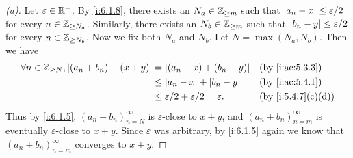 \begin{proof}[(a)]
  Let \(\varepsilon \in \mathbb{R}^+\).
  By \cref{i:6.1.8}, there exists an \(N_a \in \mathbb{Z}_{\geq m}\) such that \(\left\lvert a_n - x\right\rvert \leq \varepsilon / 2\) for every \(n \in \mathbb{Z}_{\geq N_a}\).
  Similarly, there exists an \(N_b \in \mathbb{Z}_{\geq m}\) such that \(\left\lvert b_n - y\right\rvert \leq \varepsilon / 2\) for every \(n \in \mathbb{Z}_{\geq N_b}\).
  Now we fix both \(N_a\) and \(N_b\).
  Let \(N = \max(N_a, N_b)\).
  Then we have
  \begin{align*}
    \forall n \in \Z_{\geq N}, \abs{(a_n + b_n) - (x + y)} & = \abs{(a_n - x) + (b_n - y)}                         &  & \by{i:ac:5.3.3}   \\
                                                           & \leq \abs{a_n - x} + \abs{b_n - y}                    &  & \by{i:ac:5.4.1}   \\
                                                           & \leq \varepsilon / 2 + \varepsilon / 2 = \varepsilon. &  & \by{i:5.4.7}[c,d]
  \end{align*}
  Thus by \cref{i:6.1.5}, \((a_n + b_n)_{n = N}^\infty\) is \(\varepsilon\)-close to \(x + y\), and \((a_n + b_n)_{n = m}^\infty\) is eventually \(\varepsilon\)-close to \(x + y\).
  Since \(\varepsilon\) was arbitrary, by \cref{i:6.1.5} again we know that \((a_n + b_n)_{n = m}^\infty\) converges to \(x + y\).
\end{proof}

